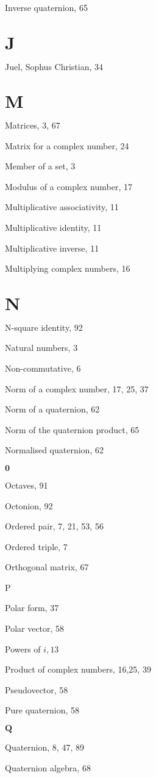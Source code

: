Inverse quaternion, 65

\section{$\mathbf{J}$}
Juel, Sophus Christian, 34

\section{$\mathbf{M}$}
Matrices, 3, 67

Matrix for a complex number, 24

Member of a set, 3

Modulus of a complex number, 17

Multiplicative associativity, 11

Multiplicative identity, 11

Multiplicative inverse, 11

Multiplying complex numbers, 16

\section{$\mathbf{N}$}
$\mathrm{N}$-square identity, 92

Natural numbers, 3

Non-commutative, 6

Norm of a complex number, 17, 25, 37

Norm of a quaternion, 62

Norm of the quaternion product, 65

Normalised quaternion, 62

$\mathbf{0}$

Octaves, 91

Octonion, 92

Ordered pair, 7, 21, 53, 56

Ordered triple, 7

Orthogonal matrix, 67

P

Polar form, 37

Polar vector, 58

Powers of $i, 13$

Product of complex numbers, 16,25, 39

Pseudovector, 58

Pure quaternion, 58

$\mathbf{Q}$

Quaternion, 8, 47, 89

Quaternion algebra, 68

